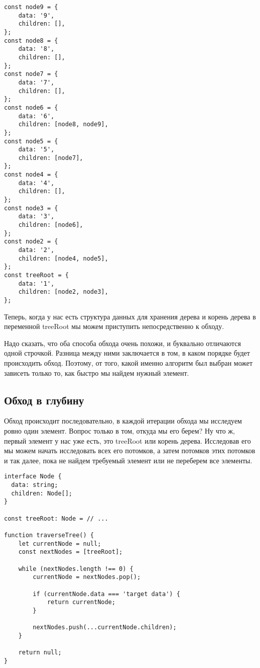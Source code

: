 \documentclass[../article.tex]{subfiles}
\begin{document}
    \begin{ruledelement}
        \begin{lstlisting}[caption={Пример {\firacodebold treeRoot}}, label={lst:treeJson}]
const node9 = {
    data: '9',
    children: [],
};
const node8 = {
    data: '8',
    children: [],
};
const node7 = {
    data: '7',
    children: [],
};
const node6 = {
    data: '6',
    children: [node8, node9],
};
const node5 = {
    data: '5',
    children: [node7],
};
const node4 = {
    data: '4',
    children: [],
};
const node3 = {
    data: '3',
    children: [node6],
};
const node2 = {
    data: '2',
    children: [node4, node5],
};
const treeRoot = {
    data: '1',
    children: [node2, node3],
};
        \end{lstlisting}
    \end{ruledelement}


Теперь, когда у нас есть структура данных для хранения дерева и корень дерева в переменной {\firacodebold treeRoot} мы можем приступить непосредственно к обходу.

Надо сказать, что оба способа обхода очень похожи, и буквально отличаются одной строчкой. Разница между ними заключается в том, в каком порядке будет происходить обход. Поэтому, от того, какой именно алгоритм был выбран может зависеть только то, как быстро мы найдем нужный элемент.

\subsection{Обход в глубину}

Обход происходит последовательно, в каждой итерации обхода мы исследуем ровно один элемент. Вопрос только в том, откуда мы его берем? Ну что ж, первый элемент у нас уже есть, это {\firacodebold treeRoot} или корень дерева. Исследовав его мы можем начать исследовать всех его потомков, а затем потомков этих потомков и так далее, пока не найдем требуемый элемент или не переберем все элементы.

\begin{strip}
    \begin{topruledelement}
        \begin{lstlisting}[caption={Обход дерева в глубину}, label={lst:treeDfs}]
interface Node {
  data: string;
  children: Node[];
}

const treeRoot: Node = // ...

function traverseTree() {
    let currentNode = null;
    const nextNodes = [treeRoot];

    while (nextNodes.length !== 0) {
        currentNode = nextNodes.pop();

        if (currentNode.data === 'target data') {
            return currentNode;
        }

        nextNodes.push(...currentNode.children);
    }

    return null;
}

        \end{lstlisting}
    \end{topruledelement}
\end{strip}
\end{document}
